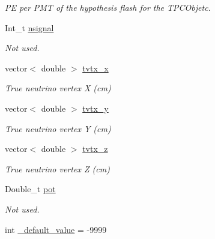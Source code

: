 \begin{DoxyCompactItemize}
\begin{DoxyCompactList}\small\item\em P\-E per P\-M\-T of the hypothesis flash for the T\-P\-C\-Objetc. \end{DoxyCompactList}\item 
\hypertarget{classUBXSecEvent_a6aff7f0ac0e26d4b80b117cb5797f1ab}{Int\-\_\-t \hyperlink{classUBXSecEvent_a6aff7f0ac0e26d4b80b117cb5797f1ab}{nsignal}}\label{classUBXSecEvent_a6aff7f0ac0e26d4b80b117cb5797f1ab}

\begin{DoxyCompactList}\small\item\em Not used. \end{DoxyCompactList}\item 
\hypertarget{classUBXSecEvent_a75b4a2318b7f7f187acdc33622a4795e}{vector$<$ double $>$ \hyperlink{classUBXSecEvent_a75b4a2318b7f7f187acdc33622a4795e}{tvtx\-\_\-x}}\label{classUBXSecEvent_a75b4a2318b7f7f187acdc33622a4795e}

\begin{DoxyCompactList}\small\item\em True neutrino vertex X (cm) \end{DoxyCompactList}\item 
\hypertarget{classUBXSecEvent_aa6532549e8c9763ae285a98976a80a94}{vector$<$ double $>$ \hyperlink{classUBXSecEvent_aa6532549e8c9763ae285a98976a80a94}{tvtx\-\_\-y}}\label{classUBXSecEvent_aa6532549e8c9763ae285a98976a80a94}

\begin{DoxyCompactList}\small\item\em True neutrino vertex Y (cm) \end{DoxyCompactList}\item 
\hypertarget{classUBXSecEvent_afcae666a9433c56792d47c53856d66ac}{vector$<$ double $>$ \hyperlink{classUBXSecEvent_afcae666a9433c56792d47c53856d66ac}{tvtx\-\_\-z}}\label{classUBXSecEvent_afcae666a9433c56792d47c53856d66ac}

\begin{DoxyCompactList}\small\item\em True neutrino vertex Z (cm) \end{DoxyCompactList}\item 
\hypertarget{classUBXSecEvent_ad783d4eedd7be14db4d5b7b9cb2d144a}{Double\-\_\-t \hyperlink{classUBXSecEvent_ad783d4eedd7be14db4d5b7b9cb2d144a}{pot}}\label{classUBXSecEvent_ad783d4eedd7be14db4d5b7b9cb2d144a}

\begin{DoxyCompactList}\small\item\em Not used. \end{DoxyCompactList}\item 
\hypertarget{classUBXSecEvent_a88e5ff2c7d0db95750e980740231d80b}{int \hyperlink{classUBXSecEvent_a88e5ff2c7d0db95750e980740231d80b}{\-\_\-default\-\_\-value} = -\/9999}\label{classUBXSecEvent_a88e5ff2c7d0db95750e980740231d80b}


\end{DoxyCompactItemize}
